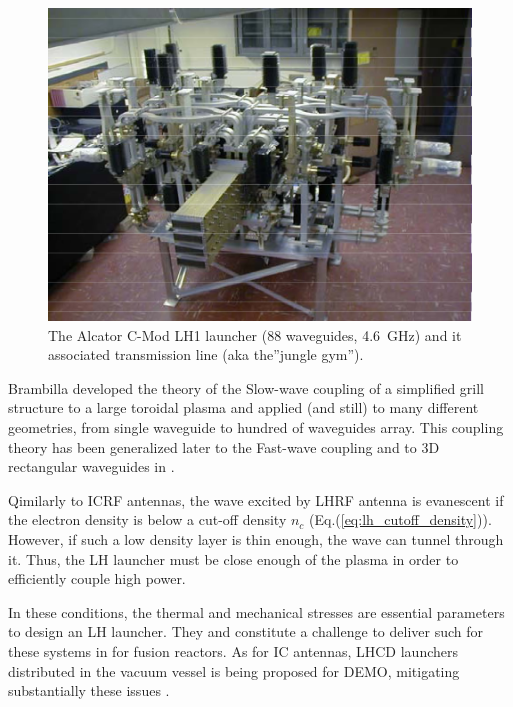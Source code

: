 \begin{figure}
	\centering
	\includegraphics[width=0.7\linewidth]{figures/chap3/CMod_LH1}
	\caption{The Alcator C-Mod LH1 launcher (88 waveguides, 4.6~GHz) and it associated transmission line (aka the”jungle gym”).}
	\label{fig:cmodlh1}
\end{figure}


Brambilla developed the theory of the Slow-wave coupling of a simplified grill structure to a large toroidal plasma  and applied (and still) to many different geometries, from single waveguide to hundred of waveguides array. This coupling theory has been generalized later to the Fast-wave coupling  and to 3D rectangular waveguides in . 

Qimilarly to ICRF antennas, the wave excited by LHRF antenna is evanescent if the electron density is below a cut-off density $n_c$ (Eq.(\ref{eq:lh_cutoff_density})). However, if such a low density layer is thin enough, the wave can tunnel through it. Thus, the LH launcher must be close enough of the plasma in order to efficiently couple high power. 

In these conditions, the thermal and mechanical stresses are essential parameters to design an LH launcher. They and constitute a challenge to deliver such for these systems in for fusion reactors. As for IC antennas, LHCD launchers distributed in the vacuum vessel is being proposed for DEMO, mitigating substantially these issues . 


